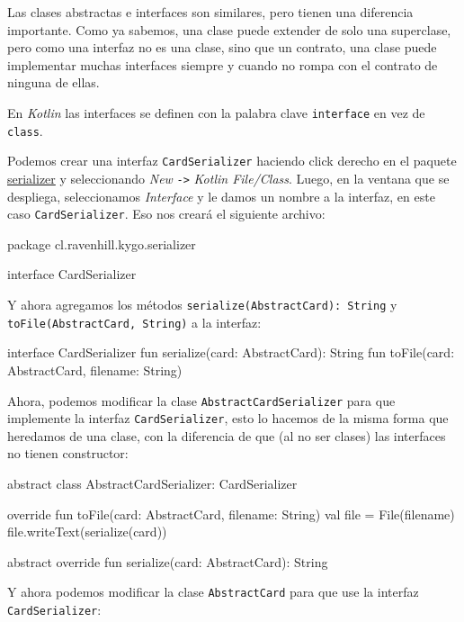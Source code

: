   Las clases abstractas e interfaces son similares, pero tienen una diferencia importante.
  Como ya sabemos, una clase puede extender de solo una superclase, pero como una interfaz no es una
  clase, sino que un contrato, una clase puede implementar muchas interfaces siempre y cuando no
  rompa con el contrato de ninguna de ellas.
  
  En \textit{Kotlin} las interfaces se definen con la palabra clave \texttt{interface} en vez de
  \texttt{class}.

  Podemos crear una interfaz \texttt{CardSerializer} haciendo click derecho en el paquete
  \url{serializer} y seleccionando \textit{New} \texttt{->} \textit{Kotlin File/Class}.
  Luego, en la ventana que se despliega, seleccionamos \textit{Interface} y le damos un nombre a la
  interfaz, en este caso \texttt{CardSerializer}.
  Eso nos creará el siguiente archivo:

  \begin{kotlin}
    package cl.ravenhill.kygo.serializer

    interface CardSerializer {
    }
  \end{kotlin}

  Y ahora agregamos los métodos \texttt{serialize(AbstractCard): String} y 
  \texttt{toFile(AbstractCard, String)} a la interfaz:

  \begin{kotlin}
    interface CardSerializer {
      fun serialize(card: AbstractCard): String
      fun toFile(card: AbstractCard, filename: String)
    }
  \end{kotlin}

  Ahora, podemos modificar la clase \texttt{AbstractCardSerializer} para que implemente la interfaz
  \texttt{CardSerializer}, esto lo hacemos de la misma forma que heredamos de una clase, con la
  diferencia de que (al no ser clases) las interfaces no tienen constructor:

  \begin{kotlin}
    abstract class AbstractCardSerializer: CardSerializer {
      override fun toFile(card: AbstractCard, filename: String) {
        val file = File(filename)
        file.writeText(serialize(card))
      }

      abstract override fun serialize(card: AbstractCard): String
    }
  \end{kotlin}

  Y ahora podemos modificar la clase \texttt{AbstractCard} para que use la interfaz \texttt{CardSerializer}:


